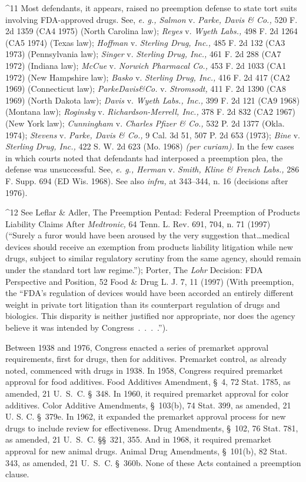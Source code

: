 {{{^11 Most defendants, it appears, raised no preemption defense to state
tort suits involving FDA-approved drugs. See, \emph{e. g., Salmon} v.
\emph{Parke, Davis \& Co.,} 520 F. 2d 1359 (CA4 1975) (North Carolina
law); \emph{Reyes} v. \emph{Wyeth Labs.,} 498 F. 2d 1264 (CA5 1974) (Texas
law); \emph{Hoffman} v. \emph{Sterling Drug, Inc.,} 485 F. 2d 132 (CA3 1973)
(Pennsylvania law); \emph{Singer} v. \emph{Sterling Drug, Inc.,} 461 F.
2d 288 (CA7 1972) (Indiana law); \emph{McCue} v. \emph{Norwich Pharmacal
Co.,} 453 F. 2d 1033 (CA1 1972) (New Hampshire law); \emph{Basko} v.
\emph{Sterling Drug, Inc.,} 416 F. 2d 417 (CA2 1969) (Connecticut law);
\emph{ParkeDavis\&Co.} v. \emph{Stromsodt,} 411 F. 2d 1390 (CA8 1969) (North
Dakota law); \emph{Davis} v. \emph{Wyeth Labs., Inc.,} 399 F. 2d 121 (CA9
1968) (Montana law); \emph{Roginsky} v. \emph{Richardson-Merrell, Inc.,} 378
F. 2d 832 (CA2 1967) (New York law); \emph{Cunningham} v. \emph{Charles Pfizer
\& Co.,} 532 P. 2d 1377 (Okla. 1974); \emph{Stevens} v. \emph{Parke, Davis \&
Co.,} 9 Cal. 3d 51, 507 P. 2d 653 (1973); \emph{Bine} v. \emph{Sterling}
\emph{Drug, Inc.,} 422 S. W. 2d 623 (Mo. 1968) \emph{(per curiam).} In the few
cases in which courts noted that defendants had interposed a preemption
plea, the defense was unsuccessful. See, \emph{e. g., Herman} v. \emph{Smith,
Kline \& French Labs.,} 286 F. Supp. 694 (ED Wis. 1968). See also
\emph{infra,} at 343--344, n. 16 (decisions after 1976).

^12 See Leflar \& Adler, The Preemption Pentad: Federal Preemption
of Products Liability Claims After \emph{Medtronic,} 64 Tenn. L. Rev.
691, 704, n. 71 (1997) (``Surely a furor would have been aroused
by the very suggestion \newpage  that\dots medical devices should
receive an exemption from products liability litigation while new drugs,
subject to similar regulatory scrutiny from the same agency, should
remain under the standard tort law regime.''); Porter, The \emph{Lohr}
Decision: FDA Perspective and Position, 52 Food \& Drug L. J. 7, 11
(1997) (With preemption, the ``FDA's regulation of devices would have
been accorded an entirely different weight in private tort litigation
than its counterpart regulation of drugs and biologics. This disparity
is neither justified nor appropriate, nor does the agency believe it was
intended by Congress~.~.~.~.'').

  Between 1938 and 1976, Congress enacted a series of premarket approval
requirements, first for drugs, then for additives. Premarket control,
as already noted, commenced with drugs in 1938. In 1958, Congress
required premarket approval for food additives. Food Additives
Amendment, \S~4, 72 Stat. 1785, as amended, 21 U.~S.~C. \S~348.
In 1960, it required premarket approval for color additives. Color
Additive Amendments, \S~103(b), 74 Stat. 399, as amended, 21 U. S.
C. \S~379e. In 1962, it expanded the premarket approval process
for new drugs to include review for effectiveness. Drug Amendments,
\S~102, 76 Stat. 781, as amended, 21 U.~S.~C. \S\S~321, 355. And
in 1968, it required premarket approval for new animal drugs. Animal
Drug Amendments, \S~101(b), 82 Stat. 343, as amended, 21 U.~S.~C.
\S~360b. None of these Acts contained a preemption clause.

}}}
